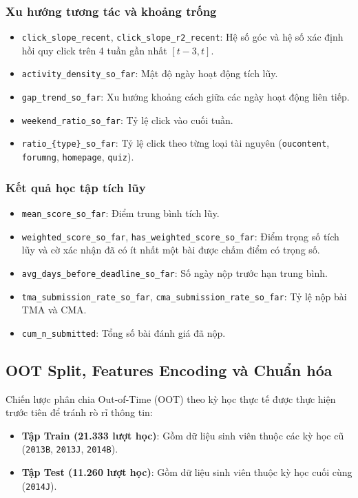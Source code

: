 \subsubsection{Xu hướng tương tác và khoảng trống}
\begin{itemize}[noitemsep,topsep=0pt]
    \item \texttt{click\_slope\_recent}, \texttt{click\_slope\_r2\_recent}: Hệ số góc và hệ số xác định hồi quy click trên 4 tuần gần nhất $[t-3, t]$.
    \item \texttt{activity\_density\_so\_far}: Mật độ ngày hoạt động tích lũy.
    \item \texttt{gap\_trend\_so\_far}: Xu hướng khoảng cách giữa các ngày hoạt động liên tiếp.
    \item \texttt{weekend\_ratio\_so\_far}: Tỷ lệ click vào cuối tuần.
    \item \texttt{ratio\_\{type\}\_so\_far}: Tỷ lệ click theo từng loại tài nguyên (\texttt{oucontent}, \texttt{forumng}, \texttt{homepage}, \texttt{quiz}).
\end{itemize}

\subsubsection{Kết quả học tập tích lũy}
\begin{itemize}[noitemsep,topsep=0pt]
    \item \texttt{mean\_score\_so\_far}: Điểm trung bình tích lũy.
    \item \texttt{weighted\_score\_so\_far}, \texttt{has\_weighted\_score\_so\_far}: Điểm trọng số tích lũy và cờ xác nhận đã có ít nhất một bài được chấm điểm có trọng số.
    \item \texttt{avg\_days\_before\_deadline\_so\_far}: Số ngày nộp trước hạn trung bình.
    \item \texttt{tma\_submission\_rate\_so\_far}, \texttt{cma\_submission\_rate\_so\_far}: Tỷ lệ nộp bài TMA và CMA.
    \item \texttt{cum\_n\_submitted}: Tổng số bài đánh giá đã nộp.
\end{itemize}

\subsection{OOT Split, Features Encoding và Chuẩn hóa}

Chiến lược phân chia Out-of-Time (OOT) theo kỳ học thực tế được thực hiện trước tiên để tránh rò rỉ thông tin:
\begin{itemize}[noitemsep,topsep=0pt]
    \item \textbf{Tập Train (21.333 lượt học)}: Gồm dữ liệu sinh viên thuộc các kỳ học cũ (\texttt{2013B}, \texttt{2013J}, \texttt{2014B}).
    \item \textbf{Tập Test (11.260 lượt học)}: Gồm dữ liệu sinh viên thuộc kỳ học cuối cùng (\texttt{2014J}).
\end{itemize}


